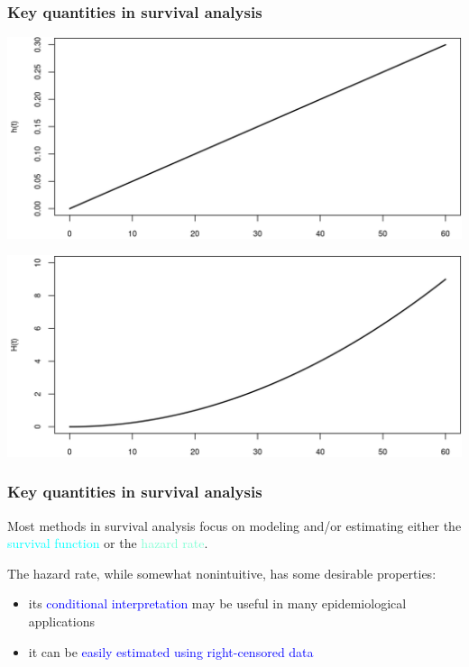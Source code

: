 \documentclass[12pt, 
hyperref={colorlinks=true, linkcolor=blue, urlcolor=cyan},dvipsnames]{beamer}
\begin{document}
\begin{frame}
\frametitle{Key quantities in survival analysis}
\centering
\includegraphics[height=0.4\textheight]{figs/hazard_function.png}

\includegraphics[height=0.4\textheight]{figs/cumulative_hazard_function.png}
\end{frame}

\begin{frame}
\frametitle{Key quantities in survival analysis}
Most methods in survival analysis focus on modeling and/or estimating either the \textcolor{cyan}{survival function} or the \textcolor{Aquamarine}{hazard rate}.

The hazard rate, while somewhat nonintuitive, has some desirable properties:
\begin{itemize}
\item its \textcolor{blue}{conditional interpretation} may be useful in many epidemiological applications
\item it can be \textcolor{blue}{easily estimated using right-censored data}
\end{itemize}
\end{frame}
\end{document}
